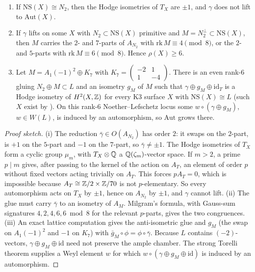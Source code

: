 \begin{proposition}\label{prop:liftgamma}
\begin{enumerate}[label=(\roman*)]
\item If $\mathrm{NS}(X)\cong N_2$, then the Hodge isometries of $T_X$ are $\pm1$, and $\gamma$ does not lift to $\mathrm{Aut}(X)$.
\item If $\gamma$ lifts on some $X$ with $N_2\subset\mathrm{NS}(X)$ primitive and $M=N_2^\perp\subset\mathrm{NS}(X)$, then $M$ carries the $2$- and $7$-parts of $A_{N_2}$ with $\mathrm{rk}\,M\equiv4\pmod8$, or the $2$- and $5$-parts with $\mathrm{rk}\,M\equiv6\pmod8$. Hence $\rho(X)\ge6$.
\item Let $M=A_1(-1)^2\oplus K_7$ with $K_7=\left(\begin{smallmatrix}-2&1\\1&-4\end{smallmatrix}\right)$. There is an even rank-$6$ gluing $N_2\oplus M\subset L$ and an isometry $g_M$ of $M$ such that $\gamma\oplus g_M\oplus\mathrm{id}_{T}$ is a Hodge isometry of $H^2(X,\mathbb{Z})$ for every K3 surface $X$ with $\mathrm{NS}(X)\cong L$ (such $X$ exist by \cite[Cor.~2.9(i)]{Morrison}). On this rank-$6$ Noether--Lefschetz locus some $w\circ(\gamma\oplus g_M)$, $w\in W(L)$, is induced by an automorphism, so $\mathrm{Aut}$ grows there.
\end{enumerate}
\end{proposition}
\begin{proof}[Proof sketch]
(i) The reduction $\bar\gamma\in O(A_{N_2})$ has order $2$: it swaps on the $2$-part, is $+1$ on the $5$-part and $-1$ on the $7$-part, so $\bar\gamma\neq\pm1$. The Hodge isometries of $T_X$ form a cyclic group $\mu_m$, with $T_X\otimes\mathbb{Q}$ a $\mathbb{Q}(\zeta_m)$-vector space. If $m>2$, a prime $p\mid m$ gives, after passing to the kernel of the action on $A_T$, an element of order $p$ without fixed vectors acting trivially on $A_T$. This forces $pA_T=0$, which is impossible because $A_T\cong\mathbb{Z}/2\times\mathbb{Z}/70$ is not $p$-elementary. So every automorphism acts on $T_X$ by $\pm1$, hence on $A_{N_2}$ by $\pm1$, and $\gamma$ cannot lift.
(ii) The glue must carry $\bar\gamma$ to an isometry of $A_M$. Milgram's formula, with Gauss-sum signatures $4,2,4,6,6\bmod8$ for the relevant $p$-parts, gives the two congruences.
(iii) An exact lattice computation gives the anti-isometric glue and $g_M$ (the swap on $A_1(-1)^2$ and $-1$ on $K_7$) with $\bar g_M\circ\phi=\phi\circ\bar\gamma$. Because $L$ contains $(-2)$-vectors, $\gamma\oplus g_M\oplus\mathrm{id}$ need not preserve the ample chamber. The strong Torelli theorem \cite[Thm.~7.5.3]{Huybrechts} supplies a Weyl element $w$ for which $w\circ(\gamma\oplus g_M\oplus\mathrm{id})$ is induced by an automorphism.
\end{proof}

